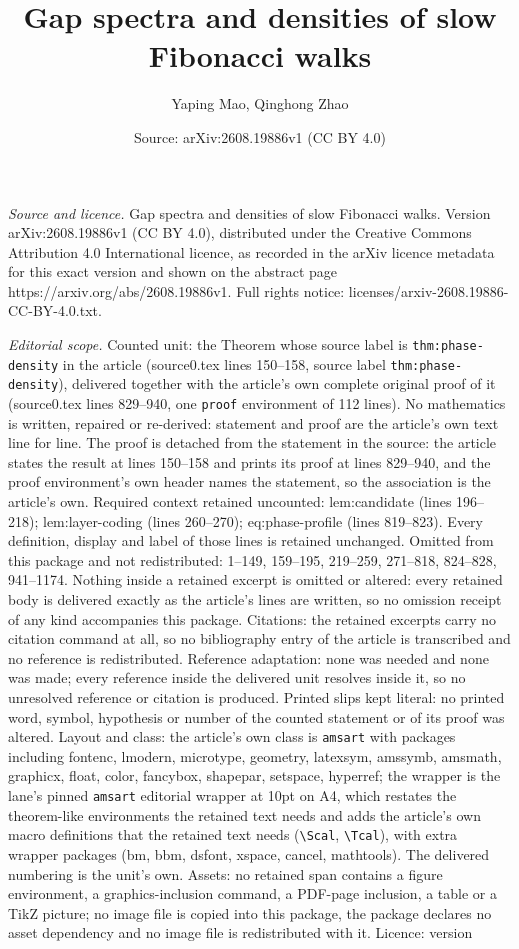 \documentclass[10pt,a4paper]{amsart}
\title[Gap spectra and densities of slow Fibonacci walks]{Gap spectra and densities of slow Fibonacci walks}
\author{Yaping Mao, Qinghong Zhao}
\date{Source: arXiv:2608.19886v1 (CC BY 4.0)}
\begin{document}
\maketitle

\noindent\emph{Source and licence.} Gap spectra and densities of slow Fibonacci walks. Version arXiv:2608.19886v1 (CC BY 4.0), distributed under the Creative Commons Attribution 4.0 International licence, as recorded in the arXiv licence metadata for this exact version and shown on the abstract page https://arxiv.org/abs/2608.19886v1. Full rights notice: licenses/arxiv-2608.19886-CC-BY-4.0.txt.\par\smallskip

\noindent\textit{Editorial scope.} Counted unit: the Theorem whose source label is \texttt{thm:phase-density} in the article (source0.tex lines 150--158, source label \texttt{thm:phase-density}), delivered together with the article's own complete original proof of it (source0.tex lines 829--940, one \texttt{proof} environment of 112 lines). No mathematics is written, repaired or re-derived: statement and proof are the article's own text line for line. The proof is detached from the statement in the source: the article states the result at lines 150--158 and prints its proof at lines 829--940, and the proof environment's own header names the statement, so the association is the article's own. Required context retained uncounted: lem:candidate (lines 196--218); lem:layer-coding (lines 260--270); eq:phase-profile (lines 819--823). Every definition, display and label of those lines is retained unchanged. Omitted from this package and not redistributed: 1--149, 159--195, 219--259, 271--818, 824--828, 941--1174. Nothing inside a retained excerpt is omitted or altered: every retained body is delivered exactly as the article's lines are written, so no omission receipt of any kind accompanies this package. Citations: the retained excerpts carry no citation command at all, so no bibliography entry of the article is transcribed and no reference is redistributed. Reference adaptation: none was needed and none was made; every reference inside the delivered unit resolves inside it, so no unresolved reference or citation is produced. Printed slips kept literal: no printed word, symbol, hypothesis or number of the counted statement or of its proof was altered. Layout and class: the article's own class is \texttt{amsart} with packages including fontenc, lmodern, microtype, geometry, latexsym, amssymb, amsmath, graphicx, float, color, fancybox, shapepar, setspace, hyperref; the wrapper is the lane's pinned \texttt{amsart} editorial wrapper at 10pt on A4, which restates the theorem-like environments the retained text needs and adds the article's own macro definitions that the retained text needs (\texttt{\textbackslash Scal}, \texttt{\textbackslash Tcal}), with extra wrapper packages (bm, bbm, dsfont, xspace, cancel, mathtools). The delivered numbering is the unit's own. Assets: no retained span contains a figure environment, a graphics-inclusion command, a PDF-page inclusion, a table or a TikZ picture; no image file is copied into this package, the package declares no asset dependency and no image file is redistributed with it. Licence: version 
\end{document}
